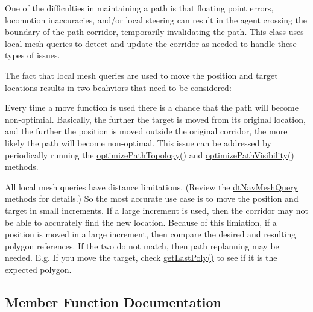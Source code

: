 One of the difficulties in maintaining a path is that floating point errors, locomotion inaccuracies, and/or local steering can result in the agent crossing the boundary of the path corridor, temporarily invalidating the path. This class uses local mesh queries to detect and update the corridor as needed to handle these types of issues.

The fact that local mesh queries are used to move the position and target locations results in two beahviors that need to be considered\+:

Every time a move function is used there is a chance that the path will become non-\/optimial. Basically, the further the target is moved from its original location, and the further the position is moved outside the original corridor, the more likely the path will become non-\/optimal. This issue can be addressed by periodically running the \hyperlink{classdtPathCorridor_a69288d28ab5d23b2c2654e45c5a33c25}{optimize\+Path\+Topology()} and \hyperlink{classdtPathCorridor_a3970b6cd229731debe6beb41d9885463}{optimize\+Path\+Visibility()} methods.

All local mesh queries have distance limitations. (Review the \hyperlink{classdtNavMeshQuery}{dt\+Nav\+Mesh\+Query} methods for details.) So the most accurate use case is to move the position and target in small increments. If a large increment is used, then the corridor may not be able to accurately find the new location. Because of this limiation, if a position is moved in a large increment, then compare the desired and resulting polygon references. If the two do not match, then path replanning may be needed. E.\+g. If you move the target, check \hyperlink{classdtPathCorridor_a4d23baaf31661832ea81fd5a6fcc0a59}{get\+Last\+Poly()} to see if it is the expected polygon. 

\subsection{Member Function Documentation}
\mbox{\label{classdtPathCorridor_aa1076957ddf987a274a756fbf8202cab}} 
